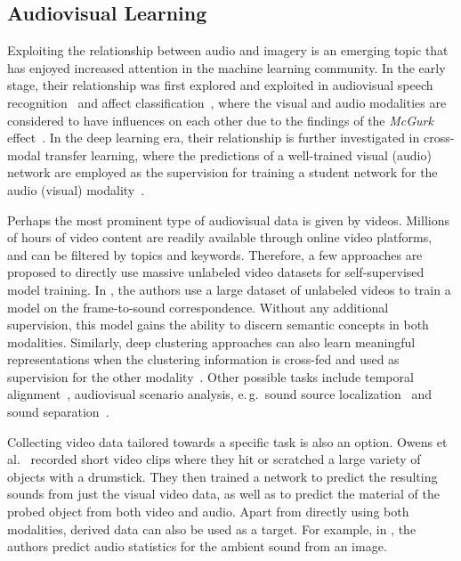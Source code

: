 \documentclass[journal]{IEEEtran}
\newcommand{\eg}{e.\,g.\ }
\begin{document}
\subsection{Audiovisual Learning}
Exploiting the relationship between audio and imagery is an emerging topic that has enjoyed increased attention
in the machine learning community.
In the early stage, their relationship was first explored and exploited in audiovisual speech recognition~\cite{petridis2018end} and affect classification~\cite{soleymani2011multimodal,tzirakis2017end}, where the visual and audio modalities are considered to have influences on each other due to the findings of the \emph{McGurk} effect~\cite{mcgurk_hearing_1976}. 
In the deep learning era, their relationship is further investigated in cross-modal transfer learning, where the predictions of a well-trained visual (audio) network are employed as the supervision for training a student network for the audio (visual) modality~\cite{aytar2016soundnet,owens2016ambient}. 

Perhaps the most prominent type of audiovisual data is given by videos. Millions of hours of video content are readily available through online video platforms, and can be filtered by topics and keywords.
Therefore, a few approaches are proposed to directly use massive unlabeled video datasets for self-supervised model training.
In \cite{arandjelovic_look_2017}, the authors use a large dataset of unlabeled videos to train a model on the frame-to-sound correspondence. Without any additional supervision, this model gains the ability to discern semantic concepts in both modalities.
Similarly, deep clustering approaches can also learn meaningful representations when the clustering information is cross-fed and used as supervision for the other modality~\cite{alwassel_self-supervised_2020}.
Other possible tasks include
temporal alignment~\cite{korbar_cooperative_2018,owens_audio-visual_2018},
audiovisual scenario analysis,
\eg sound source localization~\cite{senocak2018learning,qian2020multiple}
and sound separation~\cite{zhao2018sound,gao2019co}.

Collecting video data tailored towards a specific task is also an option. Owens et al.~\cite{owens_visually_2016} recorded short video clips where they hit or scratched a large variety of objects with a drumstick. They then trained a network to predict the resulting sounds from just the visual video data, as well as to predict the material of the probed object from both video and audio. 
Apart from directly using both modalities,
derived data can also be used as a target.
For example, in \cite{owens2016ambient}, the authors
predict audio statistics for the ambient sound from an image.
\end{document}
